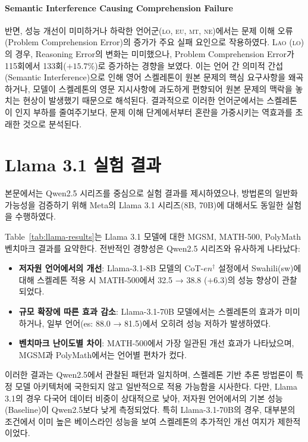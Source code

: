 \paragraph{Semantic Interference Causing Comprehension Failure}
반면, 성능 개선이 미미하거나 하락한 언어군(\textsc{lo, eu, mt, ne})에서는 문제 이해 오류(Problem Comprehension Error)의 증가가 주요 실패 요인으로 작용하였다.
\textsc{Lao (lo)}의 경우, Reasoning Error의 변화는 미미했으나, Problem Comprehension Error가 115회에서 133회($+15.7\%$)로 증가하는 경향을 보였다. 이는 언어 간 의미적 간섭(Semantic Interference)으로 인해 영어 스켈레톤이 원본 문제의 핵심 요구사항을 왜곡하거나, 모델이 스켈레톤의 영문 지시사항에 과도하게 편향되어 원본 문제의 맥락을 놓치는 현상이 발생했기 때문으로 해석된다. 결과적으로 이러한 언어군에서는 스켈레톤이 인지 부하를 줄여주기보다, 문제 이해 단계에서부터 혼란을 가중시키는 역효과를 초래한 것으로 분석된다.


\section{Llama 3.1 실험 결과}\label{Appendix:Llama-results}

본문에서는 Qwen2.5 시리즈를 중심으로 실험 결과를 제시하였으나, 방법론의 일반화 가능성을 검증하기 위해 Meta의 Llama 3.1 시리즈(8B, 70B)에 대해서도 동일한 실험을 수행하였다.

Table~\ref{tab:llama-results}는 Llama 3.1 모델에 대한 MGSM, MATH-500, PolyMath 벤치마크 결과를 요약한다. 전반적인 경향성은 Qwen2.5 시리즈와 유사하게 나타났다:

\begin{itemize}
    \item \textbf{저자원 언어에서의 개선}: Llama-3.1-8B 모델의 CoT-$en^{\dagger}$ 설정에서 Swahili(sw)에 대해 스켈레톤 적용 시 MATH-500에서 32.5 → 38.8 ($+6.3$)의 성능 향상이 관찰되었다.
    \item \textbf{규모 확장에 따른 효과 감소}: Llama-3.1-70B 모델에서는 스켈레톤의 효과가 미미하거나, 일부 언어(es: 88.0 → 81.5)에서 오히려 성능 저하가 발생하였다.
    \item \textbf{벤치마크 난이도별 차이}: MATH-500에서 가장 일관된 개선 효과가 나타났으며, MGSM과 PolyMath에서는 언어별 편차가 컸다.
\end{itemize}

이러한 결과는 Qwen2.5에서 관찰된 패턴과 일치하며, 스켈레톤 기반 추론 방법론이 특정 모델 아키텍처에 국한되지 않고 일반적으로 적용 가능함을 시사한다. 다만, Llama 3.1의 경우 다국어 데이터 비중이 상대적으로 낮아, 저자원 언어에서의 기본 성능(Baseline)이 Qwen2.5보다 낮게 측정되었다. 특히 Llama-3.1-70B의 경우, 대부분의 조건에서 이미 높은 베이스라인 성능을 보여 스켈레톤의 추가적인 개선 여지가 제한적이었다.



